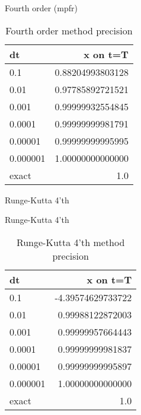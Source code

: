 \documentclass[10pt]{beamer}
\begin{document}
\begin{frame}{Fourth order (mpfr)}
  \begin{table}
    \caption{Fourth order method precision}
    \begin{tabular}{lr}
      \toprule
      dt & x on t=T\\
      \midrule
      0.1 & 0.88204993803128\\
      0.01 & 0.97785892721521\\
      0.001 & 0.99999932554845\\
      0.0001 & 0.99999999981791\\
      0.00001 & 0.99999999995995\\
      0.000001 & 1.00000000000000\\
      \midrule
      exact & 1.0 \\
      \bottomrule
    \end{tabular}
  \end{table}
\end{frame}

\begin{frame}{Runge-Kutta 4'th}
  \begin{figure}
  \end{figure}
\end{frame}

\begin{frame}{Runge-Kutta 4'th}
  \begin{table}
    \caption{Runge-Kutta 4'th method precision}
    \begin{tabular}{lr}
      \toprule
      dt & x on t=T\\
      \midrule
      0.1 & -4.39574629733722\\
      0.01 & 0.99988122872003\\
      0.001 & 0.99999957664443\\
      0.0001 & 0.99999999981837\\
      0.00001 & 0.99999999995897\\
      0.000001 & 1.00000000000000\\
      \midrule
      exact & 1.0 \\
      \bottomrule
    \end{tabular}
  \end{table}
\end{frame}
\end{document}
